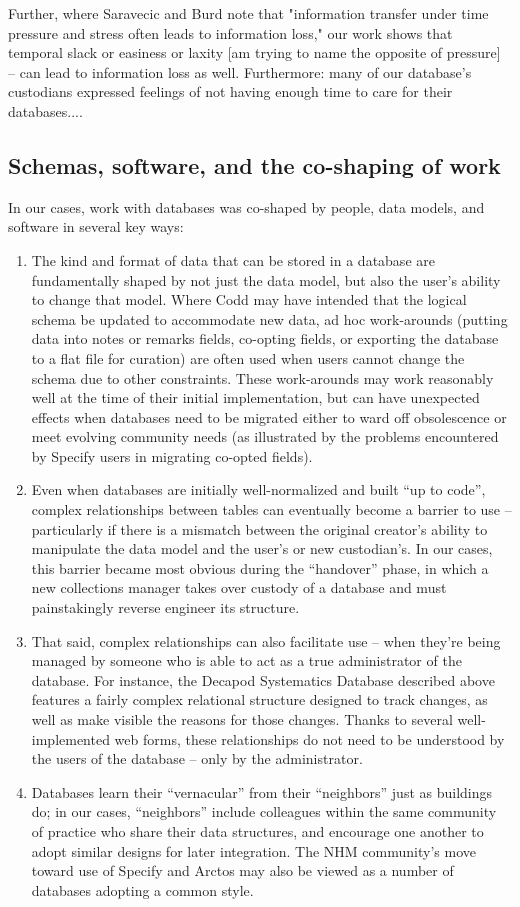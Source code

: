 Further, where Saravecic and Burd note that "information transfer under time pressure and stress often leads to information loss," our work shows that temporal slack or easiness or laxity [am trying to name the opposite of pressure] -- can lead to information loss as well. Furthermore: many of our database's custodians expressed feelings of not having enough time to care for their databases....

\subsection{Schemas, software, and the co-shaping of work}

In our cases, work with databases was co-shaped by people, data models, and software in several key ways: 
\begin{enumerate}
\item The kind and format of data that can be stored in a database are fundamentally shaped by not just the data model, but also the user’s ability to change that model. Where Codd may have intended that the logical schema be updated to accommodate new data, ad hoc work-arounds (putting data into notes or remarks fields, co-opting fields, or exporting the database to a flat file for curation) are often used when users cannot change the schema due to other constraints. These work-arounds may work reasonably well at the time of their initial implementation, but can have unexpected effects when databases need to be migrated either to ward off obsolescence or meet evolving community needs (as illustrated by the problems encountered by Specify users in migrating co-opted fields). 
\item Even when databases are initially well-normalized and built “up to code”, complex relationships between tables can eventually become a barrier to use – particularly if there is a mismatch between the original creator’s ability to manipulate the data model and the user’s or new custodian’s. In our cases, this barrier became most obvious during the “handover” phase, in which a new collections manager takes over custody of a database and must painstakingly reverse engineer its structure. 
\item That said, complex relationships can also facilitate use -- when they’re being managed by someone who is able to act as a true administrator of the database. For instance, the Decapod Systematics Database described above features a fairly complex relational structure designed to track changes, as well as make visible the reasons for those changes. Thanks to several well-implemented web forms, these relationships do not need to be understood by the users of the database – only by the administrator.
\item Databases learn their “vernacular” from their “neighbors” just as buildings do; in our cases, “neighbors” include colleagues within the same community of practice who share their data structures, and encourage one another to adopt similar designs for later integration. The NHM community’s move toward use of Specify and Arctos may also be viewed as a number of databases adopting a common style. 
\end{enumerate}

